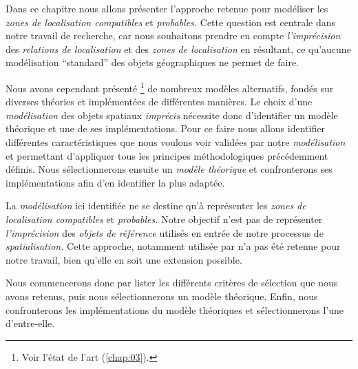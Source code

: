 Dans ce chapitre nous allons présenter l'approche retenue pour
modéliser les \emph{zones de localisation compatibles} et
\emph{probables.} Cette question est centrale dans notre travail de
recherche, car nous souhaitons prendre en compte \emph{l'imprécision}
des \emph{relations de localisation} et des \emph{zones de
  localisation} en résultant, ce qu'aucune modélisation
\enquote{standard} des objets géographiques ne permet de faire.

Nous avons cependant présenté \footnote{Voir l'état de l'art
  (\autoref{chap:03}).} de nombreux modèles alternatifs, fondés sur
diverses théories et implémentées de différentes manières. Le choix
d'une \emph{modélisation} des objets spatiaux \emph{imprécis}
nécessite donc d'identifier un modèle théorique et une de ses
implémentations. Pour ce faire nous allons identifier différentes
caractéristiques que nous voulons voir validées par notre
\emph{modélisation} et permettant d'appliquer tous les principes
méthodologiques précédemment définis. Nous sélectionnerons ensuite un
\emph{modèle théorique} et confronterons ses implémentations afin d'en
identifier la plus adaptée.

La \emph{modélisation} ici identifiée ne se destine qu'à représenter
les \emph{zones de localisation compatibles} et \emph{probables.}
Notre objectif n'est pas de représenter \emph{l'imprécision} des
\emph{objets de référence} utilisés en entrée de notre processus de
\emph{spatialisation.} Cette approche, notamment utilisée par
\textcite{Bloch1996} n'a pas été retenue pour notre travail, bien
qu'elle en soit une extension possible.

Nous commencerons donc par lister les différents critères de sélection
que nous avons retenus, puis nous sélectionnerons un modèle
théorique. Enfin, nous confronterons les implémentations du modèle
théoriques et sélectionnerons l'une d'entre-elle.

